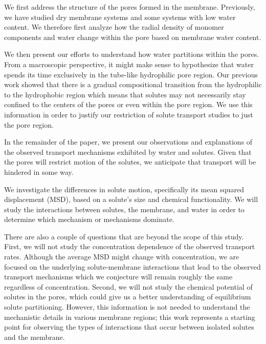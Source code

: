 \documentclass[journal=jpcbfk,manuscript=article]{achemso}
\begin{document}
 
  We first address the structure of the pores formed in the membrane.
  Previously, we have studied dry membrane systems and some systems with 
  low water content. We therefore first analyze how the radial density of monomer 
  components and water change within the pore based on membrane water content.
  
  We then present our efforts to understand how water partitions within the pores.
  From a macroscopic perspective, it might make sense to hypothesize that water 
  spends its time exclusively in the tube-like hydrophilic pore region. Our
  previous work showed that there is a gradual compositional transition from
  the hydrophilic to the hydrophobic region which means that solutes may not
  necessarily stay confined to the centers of the pores or even within the 
  pore region. We use this information in order to justify our restriction
  of solute transport studies to just the pore region.
  

  In the remainder of the paper, we present our observations 
  and explanations of the observed transport mechanisms exhibited by water
  and solutes. Given that the pores will restrict motion of the solutes, we
  anticipate that transport will be hindered in some way. 

  We investigate the differences in solute motion, specifically its mean 
  squared displacement (MSD), based on a solute's size and chemical
  functionality. We will study the interactions between solutes, the membrane,
  and water in order to determine which mechanism or mechanisms dominate.
  
  There are also a couple of questions that are beyond the scope of this study.
  First, we will not study the concentration dependence of the observed transport
  rates. Although the average MSD might change with concentration, we are 
  focused on the underlying solute-membrane interactions that lead to the 
  observed transport mechanisms which we conjecture will remain roughly
  the same regardless of concentration. Second, we will not study the chemical potential
  of solutes in the pores, which could give us a better understanding of 
  equilibrium solute partitioning. However, this information is not needed
  to understand the mechanistic details in various membrane regions; 
  this work represents a starting point for observing the types of interactions
  that occur between isolated solutes and the membrane.
\end{document}
